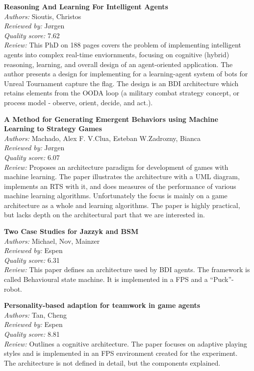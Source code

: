 {\textbf{Reasoning And Learning For Intelligent Agents\cite{sioutis2006reasoning}}\\
\textit{Authors:} Sioutis, Christos\\
\textit{Reviewed by:} J{\o}rgen\\
\textit{Quality score:} 7.62\\
\textit{Review:} This PhD on 188 pages covers the problem of implementing intelligent agents into complex real-time enviornments, focusing on cognitive (hybrid) reasoning, learning, and overall design of an agent-oriented application.
The author presents a design for implementing for a learning-agent system of bots for Unreal Tournament capture the flag. The design is an BDI architecture which retains elements from the OODA loop (a military combat strategy concept, or process model - observe, orient, decide, and act.). 


\textbf{A Method for Generating Emergent Behaviors using Machine Learning to Strategy Games\cite{machado2010method}}\\
\textit{Authors:} Machado, Alex F. V.Clua, Esteban W.Zadrozny, Bianca\\
\textit{Reviewed by:} J{\o}rgen\\
\textit{Quality score:} 6.07\\
\textit{Review:} Proposes an architecture paradigm for development of games with machine learning. The paper illustrates the architecture with a UML diagram, implements an RTS with it, and does measures of the performance of various machine learning algorithms. Unfortunately the focus is mainly on a game architecture as a whole and learning algorithms. The paper is highly practical, but lacks depth on the architectural part that we are interested in.

\textbf{Two Case Studies for Jazzyk and BSM\cite{koster2009two}}\\
\textit{Authors:} Michael, Nov, Mainzer\\
\textit{Reviewed by:} Espen\\
\textit{Quality score:} 6.31\\
\textit{Review:} This paper defines an architecture used by BDI agents. The framework is called Behavioural state machine. It is implemented in a FPS and a ``Puck''-robot.

\textbf{Personality-based adaption for teamwork in game agents\cite{tan2007personality}}\\
\textit{Authors:} Tan, Cheng\\
\textit{Reviewed by:} Espen\\
\textit{Quality score:} 8.81\\
\textit{Review:} Outlines a cognitive architecture. The paper focuses on adaptive playing styles and is implemented in an FPS environment created for the experiment. The architecture is not defined in detail, but the components explained. 

}
